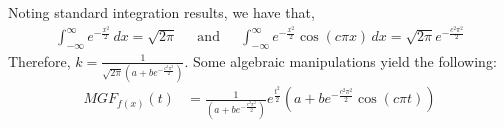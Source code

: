 \documentclass[letterpaper]{article}
\begin{document}
Noting standard integration results, we have that, 
\begin{align}
    \int_{-\infty}^{\infty} e^{-\frac{x^{2}}{2}} \,dx = \sqrt{2\pi} \;\;\;\; \text{ and } \;\;\;\; \int_{-\infty}^{\infty} e^{-\frac{x^{2}}{2}}\cos(c\pi x) \,dx = \sqrt{2\pi}e^{-\frac{c^{2}\pi^{2}}{2}} 
\end{align}
Therefore, $k = \frac{1}{\sqrt{2\pi}(a + be^{-\frac{c^{2}\pi^{2}}{2}})}$.
Some algebraic manipulations yield the following:
\begin{align*}
    MGF_{f(x)}(t) &= %
     \frac{1}{(a + be^{-\frac{c^{2}\pi^{2}}{2}})}e^{\frac{t^{2}}{2}}\left(a + be^{-\frac{c^{2}\pi^{2}}{2}}\cos(c\pi t)\right)
\end{align*}
\end{document}
